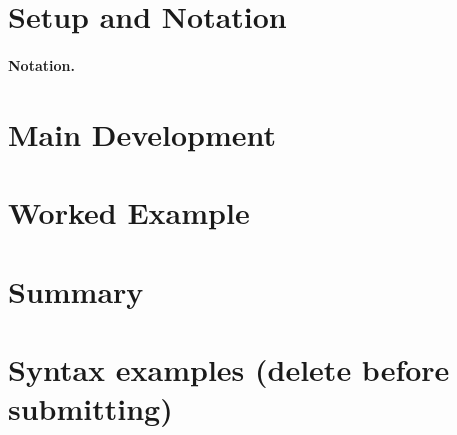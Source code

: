 \section{Setup and Notation}

\paragraph{Notation.}


\section{Main Development}


\section{Worked Example}


\section{Summary}


\section*{Syntax examples (delete before submitting)}

